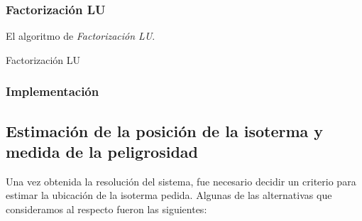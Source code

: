       \subsubsection*{Factorización LU}

        El algoritmo de \emph{Factorización LU}.

        \begin{algorithm}[H]
          \caption{Factorización LU}
        \end{algorithm}

    \subsubsection{Implementación}

  \subsection{Estimación de la posición de la isoterma y medida de la peligrosidad}

    Una vez obtenida la resolución del sistema, fue necesario decidir un criterio para estimar la ubicación de la isoterma pedida. Algunas de las alternativas que consideramos al respecto fueron las siguientes:

